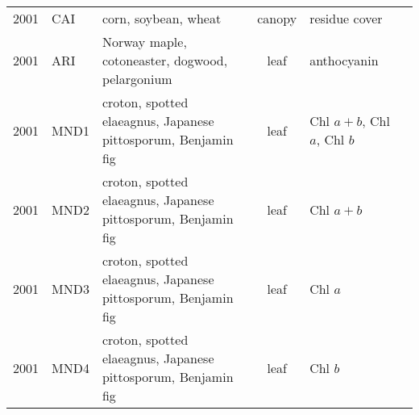 \documentclass[10pt]{article}
\begin{document}
{\begin{ThreePartTable}
\begin{longtable}{c M{1.5in} M{2.5in} c M{1.5in} M{1.5in}}
  2001 & CAI                                             & corn, soybean, wheat                                                                                                                                                                                                                                  & canopy       & residue cover                                                                            & \citet{Daughtry2001}                                \\
  2001 & ARI                                             & Norway maple, cotoneaster, dogwood, pelargonium                                                                                                                                                                                                       & leaf         & anthocyanin                                                                              & \citet{Gitelson2001}                                \\
  2001 & MND1                                            & croton, spotted elaeagnus, Japanese pittosporum, Benjamin fig                                                                                                                                                                                         & leaf         & Chl $a+b$, Chl $a$, Chl $b$                                                              & \citet{Maccioni2001}                                \\
  2001 & MND2                                            & croton, spotted elaeagnus, Japanese pittosporum, Benjamin fig                                                                                                                                                                                         & leaf         & Chl $a+b$                                                                                & \citet{Maccioni2001}                                \\
  2001 & MND3                                            & croton, spotted elaeagnus, Japanese pittosporum, Benjamin fig                                                                                                                                                                                         & leaf         & Chl $a$                                                                                  & \citet{Maccioni2001}                                \\
  2001 & MND4                                            & croton, spotted elaeagnus, Japanese pittosporum, Benjamin fig                                                                                                                                                                                         & leaf         & Chl $b$                                                                                  & \citet{Maccioni2001}                                \\

\end{longtable}
\end{ThreePartTable}}
\end{document}
